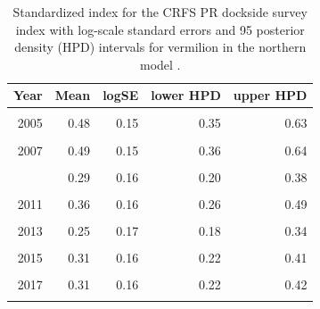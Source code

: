 \documentclass[11pt,
  english,
  a4paper,
]{article}
\begin{document}
\begin{table}

\caption{\label{tab:tab-index-crfspr}Standardized index for the CRFS PR dockside survey index with log-scale standard errors and 95%
       posterior density (HPD) intervals for vermilion in the northern model .}
\centering
\begin{tabular}[t]{rrrrr}
\toprule
Year & Mean & logSE & lower HPD & upper HPD\\
\midrule
\cellcolor{gray!6}{2004} & \cellcolor{gray!6}{0.49} & \cellcolor{gray!6}{0.14} & \cellcolor{gray!6}{0.37} & \cellcolor{gray!6}{0.63}\\
2005 & 0.48 & 0.15 & 0.35 & 0.63\\
\cellcolor{gray!6}{2006} & \cellcolor{gray!6}{0.53} & \cellcolor{gray!6}{0.15} & \cellcolor{gray!6}{0.39} & \cellcolor{gray!6}{0.69}\\
2007 & 0.49 & 0.15 & 0.36 & 0.64\\
\cellcolor{gray!6}{2008} & \cellcolor{gray!6}{0.32} & \cellcolor{gray!6}{0.16} & \cellcolor{gray!6}{0.23} & \cellcolor{gray!6}{0.44}\\
\addlinespace
2009 & 0.29 & 0.16 & 0.20 & 0.38\\
\cellcolor{gray!6}{2010} & \cellcolor{gray!6}{0.36} & \cellcolor{gray!6}{0.16} & \cellcolor{gray!6}{0.26} & \cellcolor{gray!6}{0.47}\\
2011 & 0.36 & 0.16 & 0.26 & 0.49\\
\cellcolor{gray!6}{2012} & \cellcolor{gray!6}{0.28} & \cellcolor{gray!6}{0.16} & \cellcolor{gray!6}{0.20} & \cellcolor{gray!6}{0.38}\\
2013 & 0.25 & 0.17 & 0.18 & 0.34\\
\addlinespace
\cellcolor{gray!6}{2014} & \cellcolor{gray!6}{0.26} & \cellcolor{gray!6}{0.17} & \cellcolor{gray!6}{0.19} & \cellcolor{gray!6}{0.36}\\
2015 & 0.31 & 0.16 & 0.22 & 0.41\\
\cellcolor{gray!6}{2016} & \cellcolor{gray!6}{0.33} & \cellcolor{gray!6}{0.16} & \cellcolor{gray!6}{0.24} & \cellcolor{gray!6}{0.44}\\
2017 & 0.31 & 0.16 & 0.22 & 0.42\\
\cellcolor{gray!6}{2018} & \cellcolor{gray!6}{0.38} & \cellcolor{gray!6}{0.15} & \cellcolor{gray!6}{0.28} & \cellcolor{gray!6}{0.50}\\
\bottomrule
\end{tabular}
\end{table}
\end{document}
